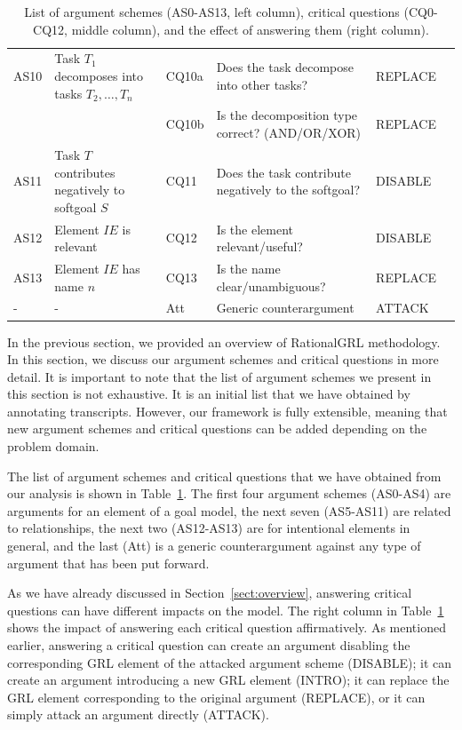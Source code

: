 \begin{table}[h]
\begin{tabularx}{\textwidth}{|l|l|l|X|l|l|}
\hline
AS10 & Task $T_1$ decomposes into tasks $T_2,\ldots,T_n$ & CQ10a & Does the task decompose into other tasks?& REPLACE\\
 &  & CQ10b & Is the decomposition type correct? (AND/OR/XOR)& REPLACE\\
\hline
AS11 & Task $T$ contributes negatively to softgoal $S$& CQ11 & Does the task contribute negatively to the softgoal?& DISABLE\\
\hline
\hline
AS12 & Element $IE$ is relevant & CQ12 & Is the element relevant/useful? & DISABLE\\
\hline
AS13 & Element $IE$ has name $n$ & CQ13 & Is the name clear/unambiguous? & REPLACE\\
\hline
\hline
- & - & Att & Generic counterargument & ATTACK\\
\hline
\end{tabularx}
\caption{List of argument schemes (AS0-AS13, left column), critical questions (CQ0-CQ12, middle column), and the effect of answering them (right column).}
\label{table:argument-schemes}
\end{table}

In the previous section, we provided an overview of RationalGRL methodology. In this section, we discuss our argument schemes and critical questions in more detail. It is important to note that the list of argument schemes we present in this section is not exhaustive. It is an initial list that we have obtained by annotating transcripts. However, our framework is fully extensible, meaning that new argument schemes and critical questions can be added depending on the problem domain.

The list of argument schemes and critical questions that we have obtained from our analysis is shown in Table~\ref{table:argument-schemes}. The first four argument schemes (AS0-AS4) are arguments for an element of a goal model, the next seven (AS5-AS11) are related to relationships, the next two (AS12-AS13) are for intentional elements in general, and the last (Att) is a generic counterargument against any type of argument that has been put forward.

As we have already discussed in Section~\ref{sect:overview}, answering critical questions can have different impacts on the model. The right column in Table~\ref{table:argument-schemes} shows the impact of answering each critical question affirmatively. %
As mentioned earlier, answering a critical question can create an argument disabling the corresponding GRL element of the attacked argument scheme (\textsf{DISABLE}); it can create an argument introducing a new GRL element (\textsf{INTRO}); it can replace the GRL element corresponding to the original argument (\textsf{REPLACE}), or it can simply attack an argument directly (\textsf{ATTACK}).

